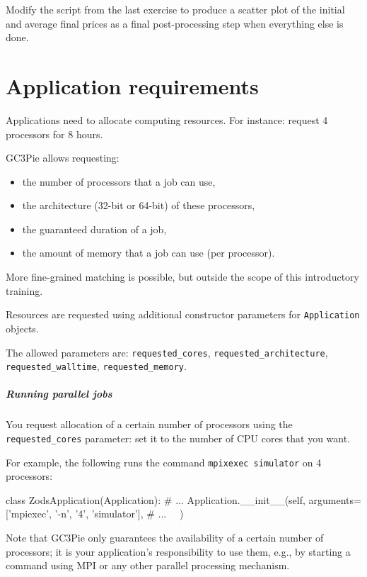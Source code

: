 \documentclass[english,serif,mathserif,xcolor=pdftex,dvipsnames,table]{beamer}
\begin{document}
\begin{frame}
  \begin{exercise*}[10.H]
    Modify the script from the last exercise to produce a scatter plot of the
    initial and average final prices as a final post-processing step when
    everything else is done.
  \end{exercise*}
\end{frame}


\part{Application requirements}

\begin{frame}
  Applications need to allocate computing resources.
  For instance: request 4 processors for 8 hours.

  \+
  GC3Pie allows requesting:
  \begin{itemize}
  \item the number of processors that a job can use,
  \item the architecture (32-bit or 64-bit) of these processors,
  \item the guaranteed duration of a job,
  \item the amount of memory that a job can use (per processor).
  \end{itemize}

  \+
  More fine-grained matching is possible, but outside the scope of
  this introductory training.
\end{frame}


\begin{frame}[fragile]
  Resources are requested using additional constructor parameters for
  \texttt{Application} objects.

  \+
  The allowed parameters are:
  \lstinline|requested_cores|,
  \lstinline|requested_architecture|,
  \lstinline|requested_walltime|,
  \lstinline|requested_memory|.
\end{frame}


\begin{frame}[fragile]
  \frametitle{Running parallel jobs}

  You request allocation of a certain number of processors using the
  \lstinline|requested_cores| parameter: set it to the number of CPU
  cores that you want.

  \+
  For example, the following runs the command \texttt{mpixexec
    simulator} on 4 processors:
  \begin{python}
  class ZodsApplication(Application):
    # ...
    Application.__init__(self,
      arguments=['mpiexec', '-n', '4', 'simulator'],
      # ...
      ~~)
  \end{python}

  \+
  {\small Note that GC3Pie only guarantees the availability of a certain
    number of processors; it is your application's responsibility to use
    them, e.g., by starting a command using MPI or any other parallel
    processing mechanism.}
\end{frame}
\end{document}

